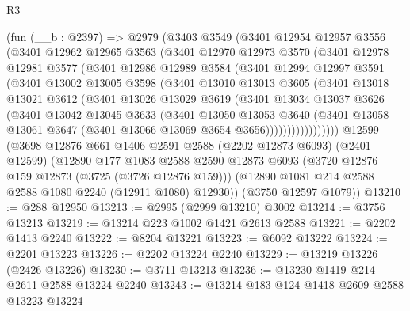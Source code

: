 \begin{lexlean}{R3}
\begin{coremodule}
    (fun (__b : @2397) =>
    @2979
      (@3403
        @3549
        (@3401
          @12954
          @12957
          @3556
          (@3401
            @12962
            @12965
            @3563
            (@3401
              @12970
              @12973
              @3570
              (@3401
                @12978
                @12981
                @3577
                (@3401
                  @12986
                  @12989
                  @3584
                  (@3401
                    @12994
                    @12997
                    @3591
                    (@3401
                      @13002
                      @13005
                      @3598
                      (@3401
                        @13010
                        @13013
                        @3605
                        (@3401
                          @13018
                          @13021
                          @3612
                          (@3401
                            @13026
                            @13029
                            @3619
                            (@3401
                              @13034
                              @13037
                              @3626
                              (@3401
                                @13042
                                @13045
                                @3633
                                (@3401
                                  @13050
                                  @13053
                                  @3640
                                  (@3401
                                    @13058
                                    @13061
                                    @3647
                                    (@3401 @13066 @13069 @3654 @3656)))))))))))))))))
    @12599
    (@3698
      @12876
      @661
      @1406
      @2591
      @2588
      (@2202 @12873 @6093)
      (@2401 @12599)
      (@12890
        @177
        @1083
        @2588
        @2590
        @12873
        @6093
        (@3720 @12876 @159 @12873 (@3725 (@3726 @12876 @159)))
        (@12890 @1081 @214 @2588 @2588 @1080 @2240 (@12911 @1080) @12930))
      (@3750 @12597 @1079))
@13210 := @288 @12950
@13213 := @2995 (@2999 @13210) @3002
@13214 := @3756 @13213
@13219 := @13214 @223 @1002 @1421 @2613 @2588
@13221 := @2202 @1413 @2240
@13222 := @8204 @13221
@13223 := @6092 @13222
@13224 := @2201 @13223
@13226 := @2202 @13224 @2240
@13229 := @13219 @13226 (@2426 @13226)
@13230 := @3711 @13213
@13236 := @13230 @1419 @214 @2611 @2588 @13224 @2240
@13243 := @13214 @183 @124 @1418 @2609 @2588 @13223 @13224

\end{coremodule}
\end{lexlean}
